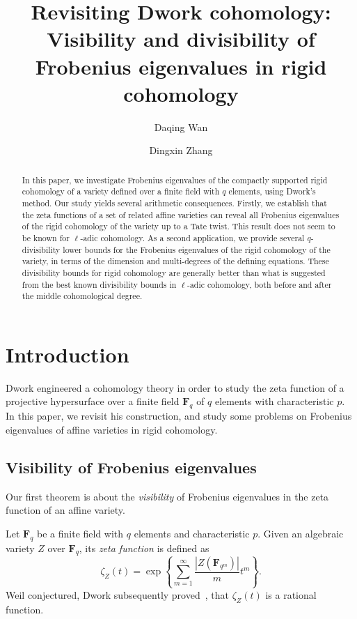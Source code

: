 \documentclass{amsart}
\title[Visibility and divisibility]%
{Revisiting Dwork cohomology: Visibility and divisibility of Frobenius eigenvalues in rigid cohomology}
\author{Daqing Wan}
\author{Dingxin Zhang}
\numberwithin{equation}{section}
\theoremstyle{plain}
\theoremstyle{definition}
\renewcommand{\mathbb}{\mathbf}
\begin{document}
\maketitle



\begin{abstract}
In this paper, we investigate Frobenius eigenvalues of the compactly
supported rigid cohomology of a variety defined over a finite field
with $q$ elements, using Dwork's method.  Our study yields several
arithmetic consequences.  Firstly, we establish that the zeta
functions of a set of related affine varieties can reveal all
Frobenius eigenvalues of the rigid cohomology of the variety up to a
Tate twist.  This result does not seem to be known for $\ell$-adic
cohomology.  As a second application, we provide several
$q$-divisibility lower bounds for the Frobenius eigenvalues of the
rigid cohomology of the variety, in terms of the dimension and
multi-degrees of the defining equations.  These divisibility bounds
for rigid cohomology are generally better than what is suggested from
the best known divisibility bounds in $\ell$-adic cohomology, both
before and after the middle cohomological degree.
\end{abstract}


\setcounter{tocdepth}{1}
\tableofcontents


\section{Introduction}
\label{sec:intro}

Dwork \cite{dwork:zeta-function-hypersurface-1} engineered a
cohomology theory in order to study the zeta function of a projective
hypersurface over a finite field $\mathbb{F}_{q}$ of $q$ elements with
characteristic $p$.  In this paper, we revisit his construction, and
study some problems on Frobenius eigenvalues of affine varieties in
rigid cohomology.

\subsection{Visibility of Frobenius eigenvalues}
Our first theorem is about the \emph{visibility} of Frobenius
eigenvalues in the zeta function of an affine variety.

Let \(\mathbb{F}_{q}\) be a finite field with \(q\) elements and
characteristic \(p\).  Given an algebraic variety \(Z\) over
\(\mathbb{F}_{q}\), its \emph{zeta function} is defined as
\begin{equation*}
  \zeta_Z(t) = \exp\left\{ \sum_{m=1}^{\infty}  \frac{|Z(\mathbb{F}_{q^m})|}{m}t^{m}\right\}.
\end{equation*}
Weil conjectured, Dwork subsequently
proved~\cite{dwork:rationality-zeta-function}, that \(\zeta_Z(t)\) is
a rational function.
\end{document}
